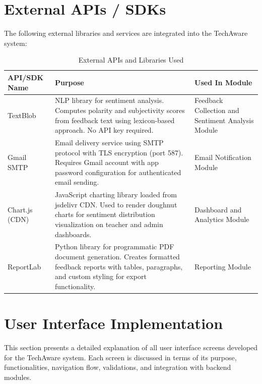 \section{External APIs / SDKs}

The following external libraries and services are integrated into the TechAware system:

\begin{table}[H]
\centering
\caption{External APIs and Libraries Used}
\begin{tabularx}{\textwidth}{|p{3cm}|X|p{4cm}|}
\hline
\textbf{API/SDK Name} & \textbf{Purpose} & \textbf{Used In Module} \\
\hline
TextBlob & NLP library for sentiment analysis. Computes polarity and subjectivity scores from feedback text using lexicon-based approach. No API key required. & Feedback Collection and Sentiment Analysis Module \\
\hline
Gmail SMTP & Email delivery service using SMTP protocol with TLS encryption (port 587). Requires Gmail account with app password configuration for authenticated email sending. & Email Notification Module \\
\hline
Chart.js (CDN) & JavaScript charting library loaded from jsdelivr CDN. Used to render doughnut charts for sentiment distribution visualization on teacher and admin dashboards. & Dashboard and Analytics Module \\
\hline
ReportLab & Python library for programmatic PDF document generation. Creates formatted feedback reports with tables, paragraphs, and custom styling for export functionality. & Reporting Module \\
\hline
\end{tabularx}
\end{table}


\section{User Interface Implementation}

This section presents a detailed explanation of all user interface screens 
developed for the TechAware system. Each screen is discussed in terms of its purpose, 
functionalities, navigation flow, validations, and integration with backend modules.


